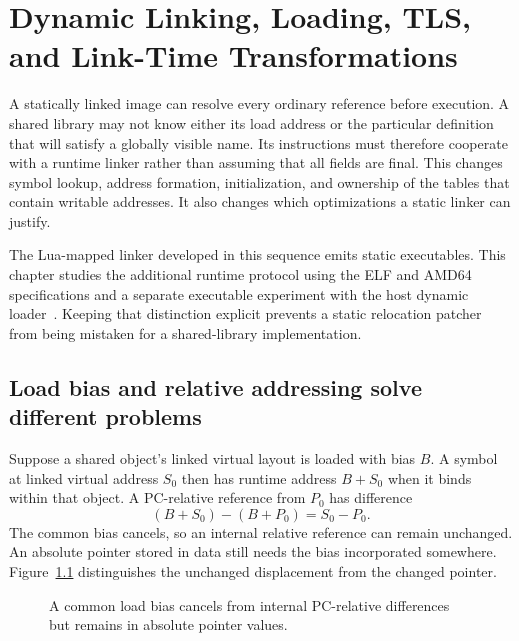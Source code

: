 \chapter{Dynamic Linking, Loading, TLS, and Link-Time Transformations}
\label{ch:dynamic-linking}

A statically linked image can resolve every ordinary reference before execution.
A shared library may not know either its load address or the particular definition that will satisfy a globally visible name.
Its instructions must therefore cooperate with a runtime linker rather than assuming that all fields are final.
This changes symbol lookup, address formation, initialization, and ownership of the tables that contain writable addresses.
It also changes which optimizations a static linker can justify.

The Lua-mapped linker developed in this sequence emits static executables.
This chapter studies the additional runtime protocol using the ELF and AMD64 specifications and a separate executable experiment with the host dynamic loader~\cite{xinuos-2026-elf,matz-2012-amd64}.
Keeping that distinction explicit prevents a static relocation patcher from being mistaken for a shared-library implementation.

\section{Load bias and relative addressing solve different problems}
\label{sec:ch59-bias}

Suppose a shared object's linked virtual layout is loaded with bias $B$.
A symbol at linked virtual address $S_0$ then has runtime address $B+S_0$ when it binds within that object.
A PC-relative reference from $P_0$ has difference
\[
 (B+S_0)-(B+P_0)=S_0-P_0.
\]
The common bias cancels, so an internal relative reference can remain unchanged.
An absolute pointer stored in data still needs the bias incorporated somewhere.
Figure~\ref{fig:ch59-bias} distinguishes the unchanged displacement from the changed pointer.

\begin{figure}[htbp]
\centering
{}
\caption{A common load bias cancels from internal PC-relative differences but remains in absolute pointer values.}
\label{fig:ch59-bias}
\end{figure}

